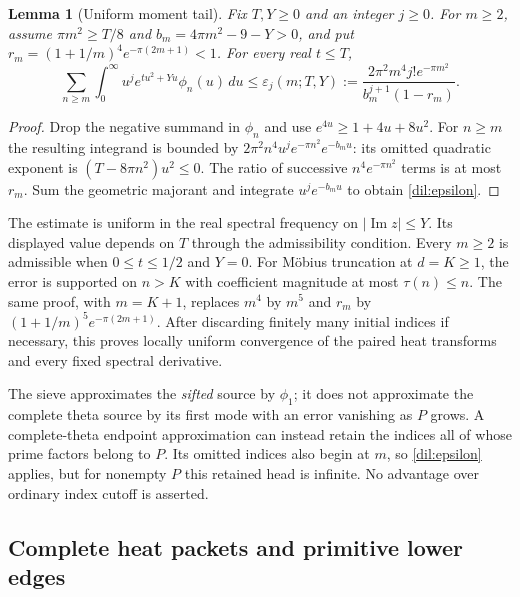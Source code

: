 \documentclass[11pt]{article}
\numberwithin{equation}{section}
\newtheorem{lemma}[theorem]{Lemma}
\theoremstyle{definition}
\theoremstyle{remark}
\begin{document}
\begin{lemma}[Uniform moment tail]
\label{dil:moment-tail}
Fix $T,Y\ge0$ and an integer $j\ge0$. For $m\ge2$, assume
$\pi m^2\ge T/8$ and $b_m=4\pi m^2-9-Y>0$, and put
$r_m=(1+1/m)^4e^{-\pi(2m+1)}<1$. For every real $t\le T$,
\begin{equation}
 \sum_{n\ge m}\int_0^\infty u^je^{tu^2+Yu}\phi_n(u)\,du
 \le\varepsilon_j(m;T,Y)
 :=\frac{2\pi^2m^4j!e^{-\pi m^2}}
 {b_m^{j+1}(1-r_m)}.
 \label{dil:epsilon}
\end{equation}
\end{lemma}
\begin{proof}
Drop the negative summand in $\phi_n$ and use
$e^{4u}\ge1+4u+8u^2$. For $n\ge m$ the resulting integrand is bounded by
$2\pi^2n^4u^je^{-\pi n^2}e^{-b_mu}$: its omitted quadratic
exponent is $(T-8\pi n^2)u^2\le0$.
The ratio of successive $n^4e^{-\pi n^2}$ terms is at most $r_m$.
Sum the geometric majorant and integrate
$u^je^{-b_mu}$ to obtain \eqref{dil:epsilon}.
\end{proof}

The estimate is uniform in the real spectral frequency on
$|\operatorname{Im}z|\le Y$. Its displayed value depends on $T$ through
the admissibility condition. Every $m\ge2$ is admissible when
$0\le t\le1/2$ and $Y=0$.
For M\"obius truncation at $d=K\ge1$, the error is supported on $n>K$
with coefficient magnitude at most $\tau(n)\le n$.
The same proof, with $m=K+1$, replaces $m^4$ by $m^5$ and $r_m$ by
$(1+1/m)^5e^{-\pi(2m+1)}$. After discarding finitely many initial
indices if necessary, this proves locally uniform convergence of the
paired heat transforms and every fixed spectral derivative.

The sieve approximates the \emph{sifted} source by $\phi_1$; it does not
approximate the complete theta source by its first mode with an error
vanishing as $P$ grows. A complete-theta endpoint approximation can instead
retain the indices all of whose prime factors belong to $P$. Its omitted
indices also begin at $m$, so \eqref{dil:epsilon} applies, but for nonempty $P$ this retained
head is infinite. No advantage over ordinary index cutoff is asserted.

\subsection{Complete heat packets and primitive lower edges}
\label{dil:packets-edges}
\end{document}
